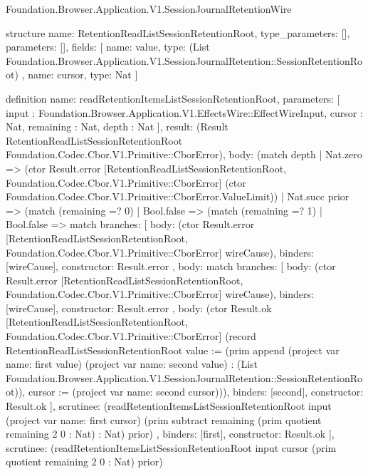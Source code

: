 \begin{lexlean}{Foundation.Browser.Application.V1.SessionJournalRetentionWire}
\begin{semanticmodule}
structure{
  name: RetentionReadListSessionRetentionRoot,
  type_parameters: [],
  parameters: [],
  fields: [
    {
      name: value,
      type: (List Foundation.Browser.Application.V1.SessionJournalRetention::SessionRetentionRoot)
    },
    {name: cursor, type: Nat}
  ]
}

definition{
  name: readRetentionItemsListSessionRetentionRoot,
  parameters: [
    input : Foundation.Browser.Application.V1.EffectsWire::EffectWireInput,
    cursor : Nat,
    remaining : Nat,
    depth : Nat
  ],
  result: (Result RetentionReadListSessionRetentionRoot Foundation.Codec.Cbor.V1.Primitive::CborError),
  body: (match depth
    | Nat.zero => (ctor Result.error [RetentionReadListSessionRetentionRoot, Foundation.Codec.Cbor.V1.Primitive::CborError] (ctor Foundation.Codec.Cbor.V1.Primitive::CborError.ValueLimit))
    | Nat.succ prior => (match (remaining =? 0)
      | Bool.false => (match (remaining =? 1)
        | Bool.false => match{
          branches: [
            {
              body: (ctor Result.error [RetentionReadListSessionRetentionRoot, Foundation.Codec.Cbor.V1.Primitive::CborError] wireCause),
              binders: [wireCause],
              constructor: Result.error
            },
            {
              body: match{
                branches: [
                  {
                    body: (ctor Result.error [RetentionReadListSessionRetentionRoot, Foundation.Codec.Cbor.V1.Primitive::CborError] wireCause),
                    binders: [wireCause],
                    constructor: Result.error
                  },
                  {
                    body: (ctor Result.ok [RetentionReadListSessionRetentionRoot, Foundation.Codec.Cbor.V1.Primitive::CborError] (record RetentionReadListSessionRetentionRoot {value := (prim append (project var{
                      name: first
                    } value) (project var{
                      name: second
                    } value) : (List Foundation.Browser.Application.V1.SessionJournalRetention::SessionRetentionRoot)), cursor := (project var{
                      name: second
                    } cursor)})),
                    binders: [second],
                    constructor: Result.ok
                  }
                ],
                scrutinee: (readRetentionItemsListSessionRetentionRoot input (project var{
                  name: first
                } cursor) (prim subtract remaining (prim quotient remaining 2 0 : Nat) : Nat) prior)
              },
              binders: [first],
              constructor: Result.ok
            }
          ],
          scrutinee: (readRetentionItemsListSessionRetentionRoot input cursor (prim quotient remaining 2 0 : Nat) prior)
}}
\end{semanticmodule}
\end{lexlean}
